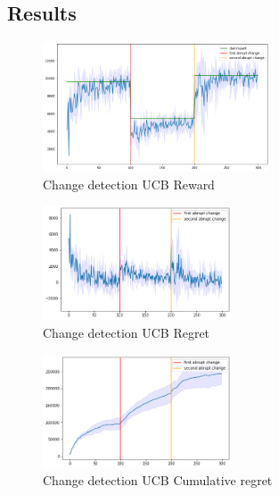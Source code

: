 \subsection{Results}
\begin{figure}[ht]
    \begin{center}
    \includegraphics[width=0.6\textwidth]{img/active_learner.png}
    \caption{Change detection UCB Reward}
    \label{fig:reward61}
    \end{center}
\end{figure}
\begin{multicols}{2}
    \begin{figure}[H]
        \begin{center}
        \includegraphics[width=0.5\textwidth]{img/active_learner_regret.png}
        \caption{Change detection UCB Regret}
        \label{fig:regret61}
        \end{center}
    \end{figure}
    \columnbreak
    \begin{figure}[H]
        \begin{center}
        \includegraphics[width=0.5\textwidth]{img/active_learner_cum_regpng.png}
        \caption{Change detection UCB Cumulative regret}
        \label{fig:cum_reg61}
        \end{center}
    \end{figure}
\end{multicols}

